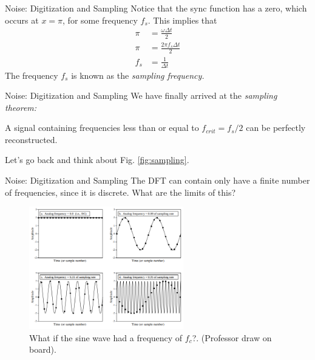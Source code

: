 \documentclass{beamer}
\begin{document}
\begin{frame}{Noise: Digitization and Sampling}
Notice that the sync function has a zero, which occurs at $x = \pi$, for some frequency $f_s$.  This implies that 
\begin{align}
\pi &= \frac{\omega \Delta t}{2} \\
\pi &= \frac{2\pi f_s \Delta t}{2} \\
f_s &= \frac{1}{\Delta t}
\end{align}
The frequency $f_s$ is known as the \textit{sampling frequency.}
\end{frame}

\begin{frame}{Noise: Digitization and Sampling}
We have finally arrived at the \textit{sampling theorem:}
\begin{tcolorbox}[colback=white,colframe=red!40!blue,title=Sampling Theorem]
\alert{A signal containing frequencies less than or equal to $f_{crit} = f_s/2$ can be perfectly reconstructed.}
\end{tcolorbox}
Let's go back and think about Fig. \ref{fig:sampling}.
\end{frame}

\begin{frame}{Noise: Digitization and Sampling}
The DFT can contain only have a finite number of frequencies, since it is discrete.  What are the limits of this?
\begin{figure}
\centering
\includegraphics[width=0.6\textwidth]{figures/sampling.png}
\caption{\label{fig:sampling2} What if the sine wave had a frequency of $f_{c}$?. (Professor draw on board).}
\end{figure}
\end{frame}
\end{document}
